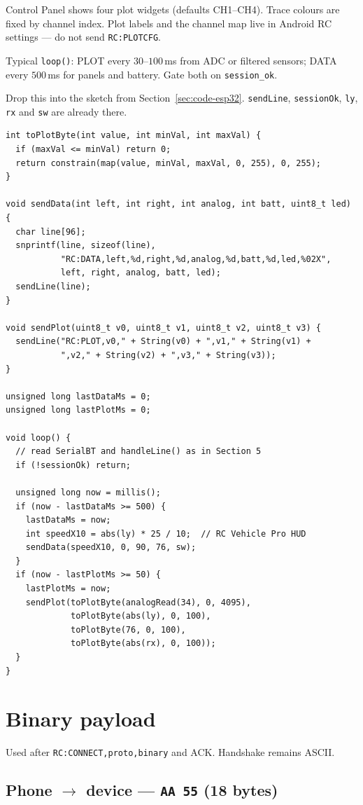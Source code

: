 \documentclass[12pt,a4paper]{article}
\begin{document}
Control Panel shows four plot widgets (defaults CH1--CH4). Trace colours are
fixed by channel index. Plot labels and the channel map live in Android RC
settings --- do not send \texttt{RC:PLOTCFG}.

Typical \texttt{loop()}: PLOT every $30$--$100$\,ms from ADC or filtered
sensors; DATA every $500$\,ms for panels and battery. Gate both on
\texttt{session\_ok}.

Drop this into the sketch from Section~\ref{sec:code-esp32}.
\texttt{sendLine}, \texttt{sessionOk}, \texttt{ly}, \texttt{rx} and
\texttt{sw} are already there.

\begin{lstlisting}
int toPlotByte(int value, int minVal, int maxVal) {
  if (maxVal <= minVal) return 0;
  return constrain(map(value, minVal, maxVal, 0, 255), 0, 255);
}

void sendData(int left, int right, int analog, int batt, uint8_t led) {
  char line[96];
  snprintf(line, sizeof(line),
           "RC:DATA,left,%d,right,%d,analog,%d,batt,%d,led,%02X",
           left, right, analog, batt, led);
  sendLine(line);
}

void sendPlot(uint8_t v0, uint8_t v1, uint8_t v2, uint8_t v3) {
  sendLine("RC:PLOT,v0," + String(v0) + ",v1," + String(v1) +
           ",v2," + String(v2) + ",v3," + String(v3));
}

unsigned long lastDataMs = 0;
unsigned long lastPlotMs = 0;

void loop() {
  // read SerialBT and handleLine() as in Section 5
  if (!sessionOk) return;

  unsigned long now = millis();
  if (now - lastDataMs >= 500) {
    lastDataMs = now;
    int speedX10 = abs(ly) * 25 / 10;  // RC Vehicle Pro HUD
    sendData(speedX10, 0, 90, 76, sw);
  }
  if (now - lastPlotMs >= 50) {
    lastPlotMs = now;
    sendPlot(toPlotByte(analogRead(34), 0, 4095),
             toPlotByte(abs(ly), 0, 100),
             toPlotByte(76, 0, 100),
             toPlotByte(abs(rx), 0, 100));
  }
}
\end{lstlisting}

\Needspace{0.72\textheight}
\section{Binary payload}
\label{sec:binary}

Used after \texttt{RC:CONNECT,proto,binary} and ACK.
Handshake remains ASCII.

\subsection{Phone $\rightarrow$ device --- \texttt{AA 55} (18 bytes)}
\end{document}
